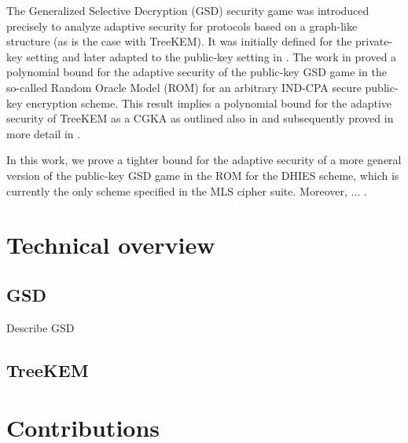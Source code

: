 The Generalized Selective Decryption (GSD) security game \cite{gsd} was introduced precisely to analyze adaptive security for protocols based on a graph-like structure (as is the case with TreeKEM). It was initially defined for the private-key setting and later adapted to the public-key setting in \cite{ttkem}. The work in \cite{ttkem} proved a polynomial bound for the adaptive security of the public-key GSD game in the so-called Random Oracle Model (ROM) for an arbitrary IND-CPA secure public-key encryption scheme. This result implies a polynomial bound for the adaptive security of TreeKEM as a CGKA as outlined also in \cite[Theorem 4]{ttkem} and subsequently proved in more detail in \cite[Theorem 12]{modular-group-messaging}.

In this work, we prove a tighter bound for the adaptive security of a more general version of the public-key GSD game in the ROM for the DHIES scheme, which is currently the only scheme specified in the MLS cipher suite. Moreover, ... .

\section{Technical overview}

\subsection{GSD}

Describe GSD

\subsection{TreeKEM}


\section{Contributions}


